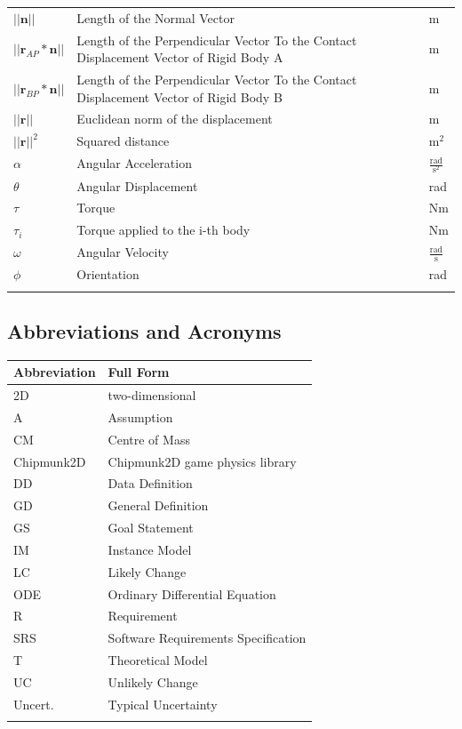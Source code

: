 \documentclass[12pt]{article}
\begin{document}
\begin{longtabu}{l X[l] l}
\\
$||\mathbf{n}||$ & Length of the Normal Vector & m
\\
$||{\mathbf{r}_{AP}}*\mathbf{n}||$ & Length of the Perpendicular Vector To the Contact Displacement Vector of Rigid Body A & m
\\
$||{\mathbf{r}_{BP}}*\mathbf{n}||$ & Length of the Perpendicular Vector To the Contact Displacement Vector of Rigid Body B & m
\\
$||\mathbf{r}||$ & Euclidean norm of the displacement & m
\\
${||\mathbf{r}||^{2}}$ & Squared distance & $\text{m}^{2}$
\\
$α$ & Angular Acceleration & $\frac{\text{rad}}{\text{s}^{2}}$
\\
$θ$ & Angular Displacement & rad
\\
$τ$ & Torque & Nm
\\
${τ_{i}}$ & Torque applied to the i-th body & Nm
\\
$ω$ & Angular Velocity & $\frac{\text{rad}}{\text{s}}$
\\
$ϕ$ & Orientation & rad
\\
\bottomrule
\label{Table:ToS}
\end{longtabu}
\subsection{Abbreviations and Acronyms}
\label{Sec:TAbbAcc}
\begin{longtable*}{l l}
\toprule
Abbreviation & Full Form
\\
\midrule
\endhead
2D & two-dimensional
\\
A & Assumption
\\
CM & Centre of Mass
\\
Chipmunk2D & Chipmunk2D game physics library
\\
DD & Data Definition
\\
GD & General Definition
\\
GS & Goal Statement
\\
IM & Instance Model
\\
LC & Likely Change
\\
ODE & Ordinary Differential Equation
\\
R & Requirement
\\
SRS & Software Requirements Specification
\\
T & Theoretical Model
\\
UC & Unlikely Change
\\
Uncert. & Typical Uncertainty
\\
\bottomrule
\label{Table:TAbbAcc}
\end{longtable*}
\end{document}
